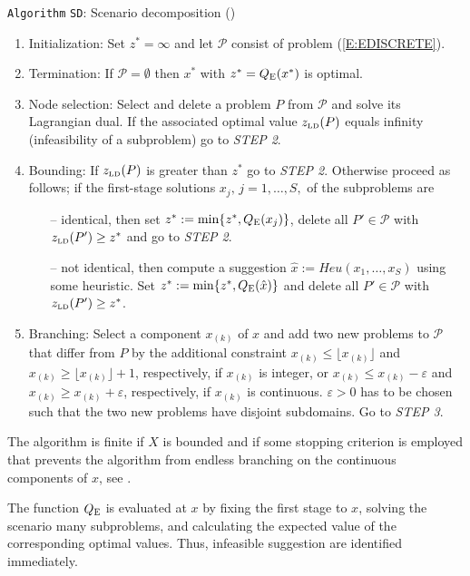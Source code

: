 \documentclass[11pt,draft]{article}
\newcommand{\expect}{{\textsc{E}}} %
\newcommand{\E}{{\expect}} %
\newcommand{\QE}{{Q_\E}}
\newcommand{\ti}[1]{\text{\tiny{#1}}}
\newcommand{\tLD}{{\ti{LD}}}
\newcommand{\+}{{\ti{+}}}
\newcommand{\1}{{\ti{1}}}
\begin{document}
\noindent
\texttt{Algorithm} \texttt{SD}: Scenario decomposition (\cite{cs1})
\begin{enumerate}[{\em STEP 1}]
\item Initialization: Set $z^*= \infty$ and let $\mathcal{P}$ consist of
problem (\ref{E:EDISCRETE}). 
\item Termination: If $\mathcal{P}=\emptyset$ then $x^*$ with $z^*=\QE(x^*)$ is optimal.
\item Node selection: Select and delete a problem $P$ from $\mathcal{P}$ and solve
its Lagrangian dual. If the associated optimal value $z_{\tLD}(P)$ equals infinity
(infeasibility of a subproblem) go to {\em STEP 2}.  
\item Bounding: If $z_{\tLD}(P)$ is greater than $z^*$ go to {\em STEP 2}. 
Otherwise proceed as follows; if the first-stage solutions $x_j,\,j=1,\ldots,S,$ of the subproblems
are 
\vspace{-.2cm}
\begin{itemize}
\item[--] identical, then set $z^*:=\min\{z^*,\QE(x_j)\}$, delete all $P' \in \mathcal{P}$ with $z_{\tLD}(P') \ge
z^*$ and go to {\em STEP 2}.
\item[--] not identical, then compute a suggestion $\hat x := Heu(x_1,\ldots,x_S)$ using 
some heuristic. Set $z^*:=\min\{z^*,\QE(\hat x)\}$ and delete all $P'
\in \mathcal{P}$ with $z_{\tLD}(P') \ge z^*$. 
\end{itemize}
\item Branching: Select a component $x_{(k)}$ of $x$ and add two new problems to
$\mathcal{P}$ that differ from $P$ by the additional constraint $x_{(k)} \le
\lfloor x_{(k)} \rfloor$ and $x_{(k)} \ge \lfloor x_{(k)} \rfloor + 1$,
respectively, if $x_{(k)}$ is integer, or   $x_{(k)} \le x_{(k)} - \varepsilon$
and $x_{(k)} \ge x_{(k)} + \varepsilon$, respectively, if $x_{(k)}$ is
continuous. $\varepsilon > 0$ has to be chosen such that the two new problems
have disjoint subdomains. Go to {\em STEP 3}. 
\end{enumerate}
The algorithm is
finite if $X$ is bounded and if some stopping criterion is employed that prevents the algorithm from  
endless branching on the continuous components of $x$, see \cite{cs1}.

The function $\QE$ is evaluated at $x$ by fixing the first stage to $x$, solving the scenario many
subproblems, and calculating the expected value of the corresponding optimal values. Thus,
infeasible suggestion are identified immediately. 
\end{document}
